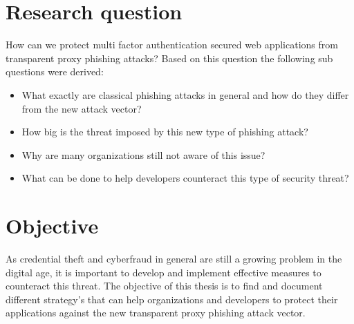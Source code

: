 \documentclass[12pt]{scrbook}
\begin{document}
\section{Research question} How can we protect multi factor authentication
secured web applications from transparent proxy phishing attacks? Based on this
question the following sub questions were derived: \begin{itemize} \item What
  exactly are classical phishing attacks in general and how do they differ from
  the new attack vector?

  \item How big is the threat imposed by this new type of phishing attack?

  \item Why are many organizations still not aware of this issue?

\item What can be done to help developers counteract this type of security
threat? \end{itemize}

\section{Objective} As credential theft and cyberfraud in general are still a
growing problem in the digital age, it is important to develop and implement
effective measures to counteract this threat. The objective of this thesis is to
find and document different strategy's that can help organizations and
developers to protect their applications against the new transparent proxy
phishing attack vector.
\end{document}
